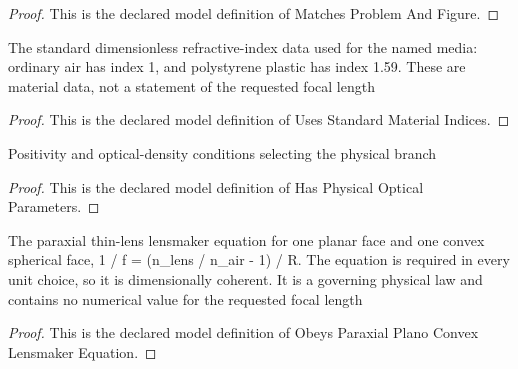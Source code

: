 \begin{proof}
  This is the declared model definition of Matches Problem And Figure.
\end{proof}
\begin{definition}
  \label{def:physics:phyx-mini-0065:phyxminiproblems-problemphyxmini0065-usesstandardmaterialindices}
  The standard dimensionless refractive-index data used for the named media: ordinary air has index 1, and polystyrene plastic has index 1.59. These are material data, not a statement of the requested focal length
\end{definition}
\begin{proof}
  This is the declared model definition of Uses Standard Material Indices.
\end{proof}
\begin{definition}
  \label{def:physics:phyx-mini-0065:phyxminiproblems-problemphyxmini0065-hasphysicalopticalparameters}
  Positivity and optical-density conditions selecting the physical branch
\end{definition}
\begin{proof}
  This is the declared model definition of Has Physical Optical Parameters.
\end{proof}
\begin{definition}
  \label{def:physics:phyx-mini-0065:phyxminiproblems-problemphyxmini0065-obeysparaxialplanoconvexlensmakerequation}
  The paraxial thin-lens lensmaker equation for one planar face and one convex spherical face, 1 / f = (n\_lens / n\_air - 1) / R. The equation is required in every unit choice, so it is dimensionally coherent. It is a governing physical law and contains no numerical value for the requested focal length
\end{definition}
\begin{proof}
  This is the declared model definition of Obeys Paraxial Plano Convex Lensmaker Equation.
\end{proof}
